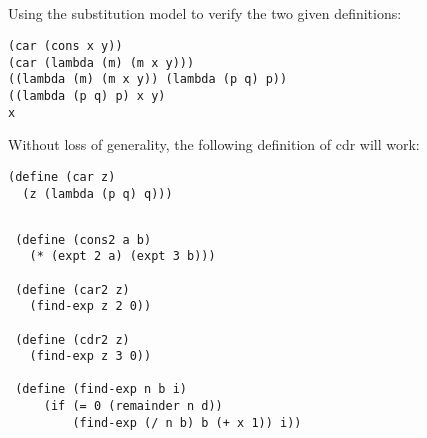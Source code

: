 \documentclass{article}
\begin{document}
\subsection{}
Using the substitution model to verify the two given definitions:
\begin{verbatim}(car (cons x y)) 
(car (lambda (m) (m x y))) 
((lambda (m) (m x y)) (lambda (p q) p)) 
((lambda (p q) p) x y) 
x
\end{verbatim}
 Without loss of generality, the following definition of cdr will work:
 \begin{verbatim}
(define (car z) 
  (z (lambda (p q) q)))
\end{verbatim}

\subsection{}

 \begin{verbatim}
 (define (cons2 a b) 
   (* (expt 2 a) (expt 3 b)))

 (define (car2 z) 
   (find-exp z 2 0))

 (define (cdr2 z) 
   (find-exp z 3 0))

 (define (find-exp n b i) 
     (if (= 0 (remainder n d)) 
         (find-exp (/ n b) b (+ x 1)) i)) 
\end{verbatim}
\end{document}
